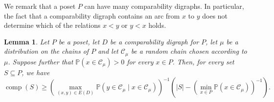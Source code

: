 \documentclass[11 pt]{article}
\newtheorem{lem}[equation]{Lemma}
\theoremstyle{definition}
\theoremstyle{case}
\numberwithin{equation}{section}
\DeclareMathOperator{\comp}{comp}
\begin{document}
We remark that a poset $P$ can have many comparability digraphs. In particular, the fact that a comparability digraph contains an arc from $x$ to $y$ does not determine which of the relations $x<y$ or $y<x$ holds. 

\begin{lem}
\label{randomCount}
Let $P$ be a poset, let $D$ be a comparability digraph for $P$, let $\mu$ be a distribution on the chains of $P$ and let $\mathcal{C}_\mu$ be a random chain chosen according to $\mu$. Suppose further that $\mathbb{P}\left(x\in \mathcal{C}_\mu\right)>0$ for every $x\in P$. Then, for every set $S\subseteq P$, we have
\[\comp(S)\geq \left({\max_{(x,y)\in E(D)}\mathbb{P}\left(y\in \mathcal{C}_\mu\mid x\in\mathcal{C}_\mu\right)}\right)^{-1}\left(|S| - \left({\min_{x\in P}\mathbb{P}\left(x\in\mathcal{C}_\mu\right)}\right)^{-1}\right).\]
\end{lem}
\end{document}
